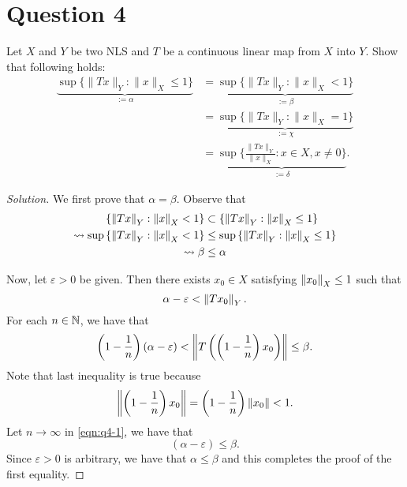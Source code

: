 \section{Question 4}
\horz
Let $X$ and $Y$ be two NLS and $T$ be a continuous linear map from $X$ into $Y.$ Show that following holds:
\begin{align}
    \underbrace{\sup \{ \|Tx\|_Y : \|x\|_X \leqslant 1\}}_{:=\alpha} &= \underbrace{\sup \{ \|Tx\|_Y : \|x\|_X < 1\}}_{:=\beta} \\
    &= \underbrace{\sup \{ \|Tx\|_Y : \|x\|_X =1\}}_{:=\chi}\\ 
    &= \underbrace{\sup \{\frac{\|Tx\|_Y}{\|x\|_X} : x\in X, x\neq 0 \}}_{:=\delta}.
    \label{eqn:q4}
\end{align}
\horz
\begin{proof}[Solution]
    We first prove that $\alpha = \beta$. Observe that  
    \begin{align*}
	\left\{ \left\lVert Tx \right\rVert_{Y} : \left\lVert x \right\rVert_{X} < 1 \right\} &\subset \left\{ \left\lVert Tx \right\rVert_{Y} : \left\lVert x \right\rVert_{X} \le 1 \right\} \\
	\leadsto \sup \left\{ \left\lVert Tx \right\rVert_{Y} : \left\lVert x \right\rVert_{X} < 1 \right\} &\le \sup \left\{ \left\lVert Tx \right\rVert_{Y} : \left\lVert x \right\rVert_{X} \le 1 \right\} \\
	\leadsto \beta &\le \alpha
    \end{align*}

    Now, let $\varepsilon > 0$ be given. Then there exists $x_{0}\in X$ satisfying $\left\lVert x_{0} \right\rVert_{X} \le 1$ such that 
    \begin{equation*}
	\alpha - \varepsilon < \left\lVert Tx_{0} \right\rVert_{Y}.
    \end{equation*}
    For each $n\in \mathbb N$, we have that 
    \begin{align}
	\left( 1- \frac{1}{n} \right)\left( \alpha - \varepsilon \right) < \left\lVert T\left( \left( 1-\frac{1}{n}  \right)x_{0} \right) \right\rVert \le \beta.
	\label{eqn:q4-1}
    \end{align}
    Note that last inequality is true because 
    \begin{equation*}
	\left\lVert \left( 1-\frac{1}{n} \right) x_{0} \right\rVert = \left( 1-\frac{1}{n} \right) \left\lVert x_{0} \right\rVert < 1.
    \end{equation*}
    Let $n\to \infty$ in \ref{eqn:q4-1}, we have that
    \begin{equation*}
	\left( \alpha - \varepsilon \right) \le \beta.
    \end{equation*}
    Since $\varepsilon > 0$ is arbitrary, we have that $\alpha \le \beta$ and this completes the proof of the first equality.


\end{proof}
